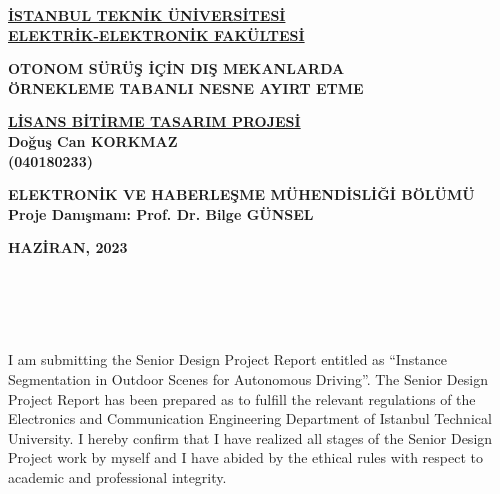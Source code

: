 \documentclass[12pt,a4paper]{report}
\begin{document}
\begin{titlepage}
   \begin{center}  
   \underline{\textbf{İSTANBUL TEKNİK ÜNİVERSİTESİ}}\\     
   \underline{\textbf{ELEKTRİK-ELEKTRONİK FAKÜLTESİ}}\\
       
    \vspace*{3cm}
    

    \textbf{OTONOM SÜRÜŞ İÇİN DIŞ MEKANLARDA}\\
    \textbf{ÖRNEKLEME TABANLI NESNE AYIRT ETME}\\
    
    
    \vspace{3cm}
    
    
    \underline{\textbf{LİSANS BİTİRME TASARIM PROJESİ}}\\
    \vspace{1cm}
    \textbf{Doğuş Can KORKMAZ} \\
    \textbf{(040180233)} \\
    
    
    \vspace{6.5cm}
        
    \textbf{ELEKTRONİK VE HABERLEŞME MÜHENDİSLİĞİ BÖLÜMÜ}\\
    
    \vspace{2cm}
    \textbf{Proje Danışmanı: Prof. Dr. Bilge GÜNSEL}\\
     

           \vfill 

       \textbf{HAZİRAN, 2023}
            
   \end{center}
\end{titlepage}

\newpage
\thispagestyle{empty}
\mbox{}
\newpage

\vspace{12cm}
\ \\
\ \\
\ \\
\ \\
\noindent I am submitting the Senior Design Project Report entitled as “Instance Segmentation in Outdoor Scenes for Autonomous Driving”. The Senior Design Project Report has been prepared as to fulfill the relevant regulations of the Electronics and Communication Engineering Department of Istanbul Technical University. I hereby confirm that I have realized all stages of the Senior Design Project work by myself and I have abided by the ethical rules with respect to academic and professional integrity. \\
\end{document}
